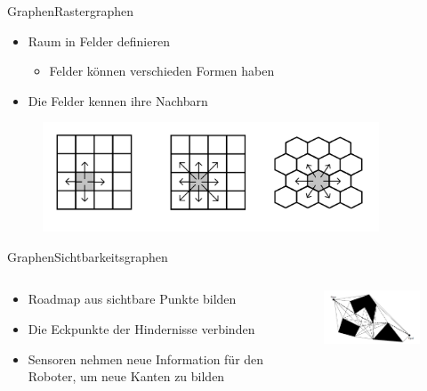 \documentclass[t,aspectratio=169,dvipsnames]{beamer}
\begin{document}
\begin{frame}{Graphen}{Rastergraphen}
	\begin{itemize}
		\item Raum in Felder definieren
		\begin{itemize}
			\item Felder können verschieden Formen haben
		\end{itemize} 
		\item Die Felder kennen ihre Nachbarn
	\end{itemize}
	\begin{figure}
		\includegraphics[width=10.0cm]{images/Grid_Tiles.png}
	\end{figure}
\end{frame}

\begin{frame}{Graphen}{Sichtbarkeitsgraphen}
	\begin{columns}
		\begin{column}[T]{0.5\textwidth}
			\begin{itemize}
				\item Roadmap aus sichtbare Punkte bilden
				\item Die Eckpunkte der Hindernisse verbinden
				\item Sensoren nehmen neue Information für den Roboter, um neue  Kanten zu bilden
			\end{itemize}
		\end{column}
		\begin{column}[T]{0.5\textwidth}
			\begin{figure}
				\includegraphics[width=6.5cm]{images/Robot_Motion_Visibility_Graph.png}
			\end{figure}
		\end{column}
	\end{columns}
\end{frame}
\end{document}

